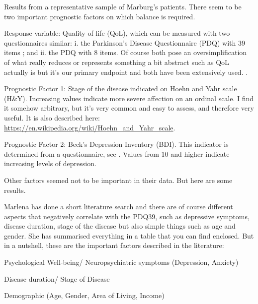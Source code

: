 \documentclass[number,12pt,review]{elsarticle}
\begin{document}
\label{varsec}

Results from a representative sample of Marburg's patients. There seem to be two important prognostic factors on which balance is required.

Response variable: Quality of life (QoL), which can be measured with two questionnaires similar: i.
the Parkinson's Disease Questionnaire (PDQ) with 39 items ; and ii. the PDQ with 8 items. {} Of course both pose an oversimplification of
what really reduces or represents something a bit abstract such as QoL actually is but it's our primary endpoint and both have been
extensively used. {}.

Prognostic Factor 1: Stage of the disease indicated on Hoehn and Yahr scale (H\&Y). Increasing values indicate more severe affection on an ordinal scale. I find it somehow arbitrary, but it's very common and easy to assess, and therefore very useful. It is also described here:
\url{https://en.wikipedia.org/wiki/Hoehn\_and\_Yahr\_scale}.

Prognostic Factor 2: Beck's Depression Inventory (BDI). This indicator is determined from a questionnaire, see \citet{beck1988bhs}. Values from 10 and higher indicate increasing levels of depression.

Other factors seemed not to be important in their data. But here are some results.


Marlena has done a short literature search and there are of course different aspects that negatively correlate
with the PDQ39, such as depressive symptoms, disease duration, stage of the disease but also simple things such as age and gender.
She has summarised everything in a table that you can find enclosed. But in a nutshell, these are the important factors described in the literature:

Psychological Well-being/ Neuropsychiatric symptoms (Depression, Anxiety)

Disease duration/ Stage of Disease

Demographic (Age, Gender, Area of Living, Income)
\end{document}
